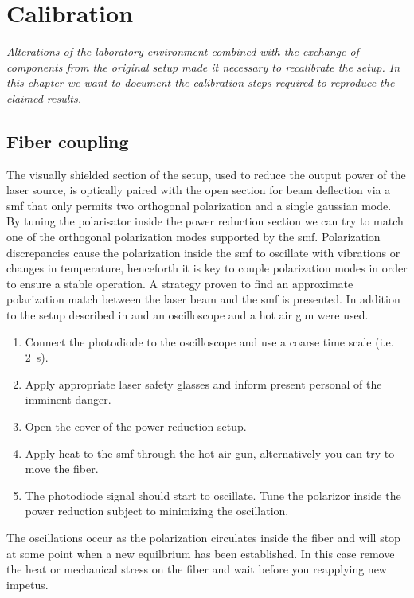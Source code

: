 \chapter{Calibration}

\textit{Alterations of the laboratory environment combined with the exchange
of components from the original setup made it necessary to recalibrate the
setup. In this chapter we want to document the calibration steps required to
reproduce the claimed results.}

\section{Fiber coupling}

The visually shielded section of the setup, used to reduce the output power
of the laser source, is optically paired with the open section for beam
deflection via a \gls{smf} that only permits two orthogonal polarization and
a single gaussian mode. By tuning the polarisator inside the power
reduction section we can try to match one of the orthogonal polarization
modes supported by the \gls{smf}. Polarization discrepancies cause the
polarization inside the \gls{smf} to oscillate with vibrations or changes in
temperature, henceforth it is key to couple polarization modes in order to
ensure a stable operation. A strategy proven to find an approximate
polarization match between the laser beam and the \gls{smf} is presented. In
addition to the setup described in  and
 an oscilloscope and a hot air gun
were used.
\begin{enumerate}
  \item Connect the photodiode to the oscilloscope and use a coarse time
    scale (i.e. \SI{2}{\second}).
  \item Apply appropriate laser safety glasses and inform present personal
    of the imminent danger.
  \item Open the cover of the power reduction setup.
  \item Apply heat to the \gls{smf} through the hot air gun, alternatively
    you can try to move the fiber.
  \item The photodiode signal should start to oscillate. Tune the polarizor
    inside the power reduction subject to minimizing the oscillation.
\end{enumerate}
The oscillations occur as the polarization circulates inside the fiber and
will stop at some point when a new equilbrium has been established. In this
case remove the heat or mechanical stress on the fiber and wait before you
reapplying new impetus.

